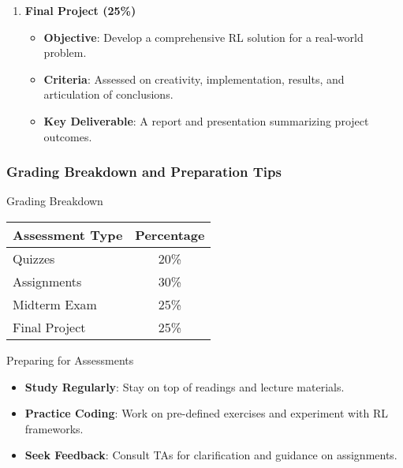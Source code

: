 \documentclass[aspectratio=169]{beamer}
\begin{document}
\begin{frame}[fragile]
\begin{enumerate}
        \item \textbf{Final Project (25\%)}
        \begin{itemize}
            \item \textbf{Objective}: Develop a comprehensive RL solution for a real-world problem.
            \item \textbf{Criteria}: Assessed on creativity, implementation, results, and articulation of conclusions.
            \item \textbf{Key Deliverable}: A report and presentation summarizing project outcomes.
        \end{itemize}
    \end{enumerate}
\end{frame}

\begin{frame}[fragile]
    \frametitle{Grading Breakdown and Preparation Tips}
    \begin{block}{Grading Breakdown}
        \begin{center}
            \begin{tabular}{|l|c|}
                \hline
                \textbf{Assessment Type} & \textbf{Percentage} \\
                \hline
                Quizzes & 20\% \\
                Assignments & 30\% \\
                Midterm Exam & 25\% \\
                Final Project & 25\% \\
                \hline
            \end{tabular}
        \end{center}
    \end{block}

    \begin{block}{Preparing for Assessments}
        \begin{itemize}
            \item \textbf{Study Regularly}: Stay on top of readings and lecture materials.
            \item \textbf{Practice Coding}: Work on pre-defined exercises and experiment with RL frameworks.
            \item \textbf{Seek Feedback}: Consult TAs for clarification and guidance on assignments.
        \end{itemize}
    \end{block}
\end{frame}
\end{document}
